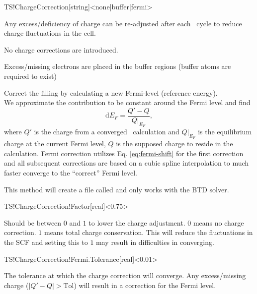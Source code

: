 \begin{fdfentry}{TS!ChargeCorrection}[string]<none|buffer|fermi>

  Any excess/deficiency of charge can be re-adjusted after each
  \tsiesta\ cycle to reduce charge fluctuations in the cell.
  
  \begin{fdfoptions}

    \option[none]%
    No charge corrections are introduced.

    \option[buffer]%
    Excess/missing electrons are placed in the buffer regions (buffer
    atoms are required to exist)

    \option[fermi] %
    Correct the filling by calculating a new Fermi-level (reference energy). \\
    We approximate the contribution to be constant around the Fermi
    level and find
    \begin{equation}
      \label{eq:fermi-shift}
      \mathrm{d}E_F = \frac{Q'-Q}{Q|_{E_F}},
    \end{equation}
    where $Q'$ is the charge from a converged \tsiesta\ calculation
    and $Q|_{E_F}$ is the equilibrium charge at the current Fermi
    level, $Q$ is the supposed charge to reside in the
    calculation. Fermi correction utilizes Eq. \eqref{eq:fermi-shift} for
    the first correction and all subsequent corrections are based on a
    cubic spline interpolation to much faster converge to the
    ``correct'' Fermi level.
    
    This method will create a file called  and only works with the BTD
    solver.
    
  \end{fdfoptions}

\end{fdfentry}

\begin{fdfentry}{TS!ChargeCorrection!Factor}[real]<0.75>

  Should be between $0$ and $1$ to lower the charge adjustment. $0$
  means no charge correction. $1$ means total charge
  conservation. This will reduce the fluctuations in the SCF and
  setting this to $1$ may result in difficulties in converging.
  
\end{fdfentry}

\begin{fdfentry}{TS!ChargeCorrection!Fermi.Tolerance}[real]<0.01>

  The tolerance at which the charge correction will converge. Any
  excess/missing charge ($|Q'-Q|>\mathrm{Tol}$) will result in a
  correction for the Fermi level.
  
\end{fdfentry}


